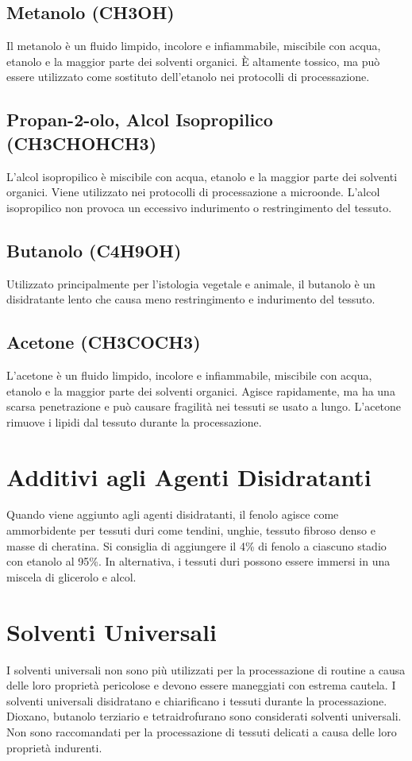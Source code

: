 \subsection{Metanolo (CH3OH)}
Il metanolo è un fluido limpido, incolore e infiammabile, miscibile con acqua, etanolo e la maggior parte dei solventi organici. È altamente tossico, ma può essere utilizzato come sostituto dell'etanolo nei protocolli di processazione.

\subsection{Propan-2-olo, Alcol Isopropilico (CH3CHOHCH3)}
L'alcol isopropilico è miscibile con acqua, etanolo e la maggior parte dei solventi organici. Viene utilizzato nei protocolli di processazione a microonde. L'alcol isopropilico non provoca un eccessivo indurimento o restringimento del tessuto.

\subsection{Butanolo (C4H9OH)}
Utilizzato principalmente per l'istologia vegetale e animale, il butanolo è un disidratante lento che causa meno restringimento e indurimento del tessuto.

\subsection{Acetone (CH3COCH3)}
L'acetone è un fluido limpido, incolore e infiammabile, miscibile con acqua, etanolo e la maggior parte dei solventi organici. Agisce rapidamente, ma ha una scarsa penetrazione e può causare fragilità nei tessuti se usato a lungo. L'acetone rimuove i lipidi dal tessuto durante la processazione.

\section{Additivi agli Agenti Disidratanti}
Quando viene aggiunto agli agenti disidratanti, il fenolo agisce come ammorbidente per tessuti duri come tendini, unghie, tessuto fibroso denso e masse di cheratina. Si consiglia di aggiungere il 4\% di fenolo a ciascuno stadio con etanolo al 95\%. In alternativa, i tessuti duri possono essere immersi in una miscela di glicerolo e alcol.

\section{Solventi Universali}
I solventi universali non sono più utilizzati per la processazione di routine a causa delle loro proprietà pericolose e devono essere maneggiati con estrema cautela. I solventi universali disidratano e chiarificano i tessuti durante la processazione. Dioxano, butanolo terziario e tetraidrofurano sono considerati solventi universali. Non sono raccomandati per la processazione di tessuti delicati a causa delle loro proprietà indurenti.



